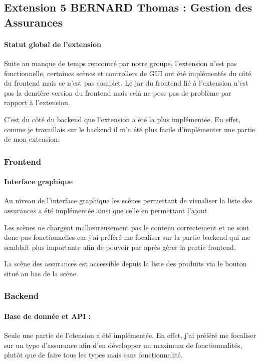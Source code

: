 \documentclass[../rapport.tex]{subfiles}
\begin{document}
	\subsection{Extension 5 BERNARD Thomas : Gestion des Assurances}
		
		\paragraph{Statut global de l'extension}
			Suite au manque de temps rencontré par notre groupe, l'extension n'est pas
			fonctionnelle, certaines scènes et controllers de GUI ont été implémentés du côté
			du frontend mais ce n'est pas complet. Le jar du frontend lié à l'extension n'est
			pas la denrière version du frontend mais celà ne pose pas de problème par rapport
			à l'extension.

			\medskip

			C'est du côté du backend que l'extension a été la plus implémentée. En effet,
			comme je travaillais sur le backend il m'a été plus facile d'implémenter 
			une partie de mon extension.

		\subsubsection{Frontend}
			
			\paragraph{Interface graphique}
			Au niveau de l'interface graphique les scènes permettant de visualiser la 
			liste des assurances a été implémentée ainsi que celle en permettant l'ajout.
			
			\medskip

			Les scènes ne chargent malheureusement pas le contenu correctement et ne sont donc
			pas fonctionnelles car j'ai préféré me focaliser sur la partie backend qui me 
			semblait plus importante afin de pouvoir par après gérer la partie frontend.
			
			\medskip

			La scène des assurances est accessible depuis la liste des produits via le bouton
			situé au bas de la scène.

		
		\subsubsection{Backend}

			\paragraph{Base de donnée et API :}
			Seule une partie de l'etension a été implémentée. En effet, j'ai préféré me focaliser
			sur un type d'assurance afin d'en développer un maximum de fonctionnalités, plutôt
			que de faire tous les types mais sans fonctionnalité.
\end{document}
